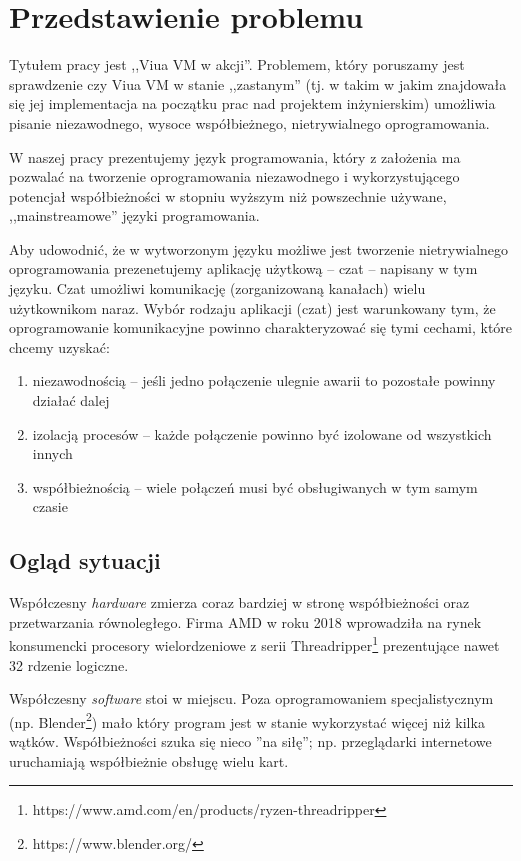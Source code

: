 \documentclass[11pt,oneside,a4paper,titlepage,onecolumn]{book}
\newcommand{\inzmaintitlePL}{Viua VM w akcji}
\begin{document}
\section{Przedstawienie problemu}

Tytułem pracy jest ,,\inzmaintitlePL''. Problemem, który poruszamy jest sprawdzenie czy Viua VM w stanie
,,zastanym'' (tj. w takim w jakim znajdowała się jej implementacja na początku prac nad projektem
inżynierskim) umożliwia pisanie niezawodnego, wysoce współbieżnego, nietrywialnego oprogramowania.

W naszej pracy prezentujemy język programowania, który z założenia ma pozwalać na tworzenie oprogramowania
niezawodnego i wykorzystującego potencjał współbieżności w stopniu wyższym niż powszechnie używane,
,,mainstreamowe'' języki programowania.

Aby udowodnić, że w wytworzonym języku możliwe jest tworzenie nietrywialnego oprogramowania prezenetujemy
aplikację użytkową -- czat -- napisany w tym języku. Czat umożliwi komunikację (zorganizowaną kanałach) wielu
użytkownikom naraz. Wybór rodzaju aplikacji (czat) jest warunkowany tym, że oprogramowanie komunikacyjne
powinno charakteryzować się tymi cechami, które chcemy uzyskać:

\begin{enumerate}
    \item niezawodnością -- jeśli jedno połączenie ulegnie awarii to pozostałe powinny działać dalej
    \item izolacją procesów -- każde połączenie powinno być izolowane od wszystkich innych
    \item współbieżnością -- wiele połączeń musi być obsługiwanych w tym samym czasie
\end{enumerate}

\subsection{Ogląd sytuacji}

Współczesny \emph{hardware} zmierza coraz bardziej w stronę współbieżności oraz przetwarzania równoległego.
Firma AMD w roku 2018 wprowadziła na rynek konsumencki procesory wielordzeniowe z serii
Threadripper\footnote{https://www.amd.com/en/products/ryzen-threadripper} prezentujące nawet 32 rdzenie logiczne.

Współczesny \emph{software} stoi w miejscu. Poza oprogramowaniem specjalistycznym (np.
Blender\footnote{https://www.blender.org/}) mało który program jest w stanie wykorzystać więcej niż kilka wątków.
Współbieżności szuka się nieco ''na siłę''; np. przeglądarki internetowe uruchamiają współbieżnie obsługę
wielu kart.
\end{document}
